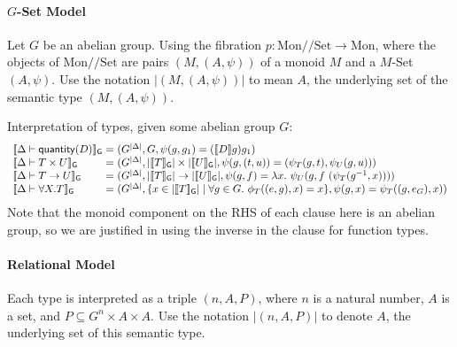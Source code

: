 \documentclass{article}
\newcommand{\semGrp}[1]{\llbracket #1 \rrbracket_{\mathsf{G}}}
\newcommand{\sem}[1]{\llbracket #1 \rrbracket}
\begin{document}
\paragraph{$G$-Set Model} Let $G$ be an abelian group. Using the
fibration $p : \mathrm{Mon}//\mathrm{Set} \to \mathrm{Mon}$, where the
objects of $\mathrm{Mon}//\mathrm{Set}$ are pairs $(M, (A, \psi))$ of
a monoid $M$ and a $M$-Set $(A, \psi)$. Use the notation
$|(M,(A,\psi))|$ to mean $A$, the underlying set of the semantic type
$(M,(A,\psi))$.

Interpretation of types, given some abelian group $G$:
\begin{displaymath}
  \begin{array}{l@{\hspace{0.3em}}c@{\hspace{0.3em}}l}
    \semGrp{\Delta \vdash \mathsf{quantity}(D)} &=&
    (G^{|\Delta|}, G, \psi(g,g_1) = (\sem{D}g)g_1) \\
    \semGrp{\Delta \vdash T \times U} &=&
    (G^{|\Delta|}, |\semGrp{T}| \times |\semGrp{U}|, \psi(g,(t,u)) = (\psi_T(g,t), \psi_U(g,u))) \\
    \semGrp{\Delta \vdash T \to U} &=&
    (G^{|\Delta|}, |\semGrp{T}| \to |\semGrp{U}|, \psi(g,f) = \lambda x.~\psi_U(g, f~(\psi_T(g^{-1}, x)))) \\
    \semGrp{\Delta \vdash \forall X.T} &=&
    (G^{|\Delta|}, \{ x \in |\semGrp{T}| \mathrel| \forall g \in G.~\phi_T((e,g),x) = x \}, \psi(g,x) = \psi_T((g,e_G),x))
  \end{array}
\end{displaymath}
Note that the monoid component on the RHS of each clause here is an
abelian group, so we are justified in using the inverse in the clause
for function types.

\paragraph{Relational Model} Each type is interpreted as a triple $(n, A, P)$,
where $n$ is a natural number, $A$ is a set, and $P \subseteq G^n
\times A \times A$. Use the notation $|(n,A,P)|$ to denote $A$, the
underlying set of this semantic type.
\end{document}
